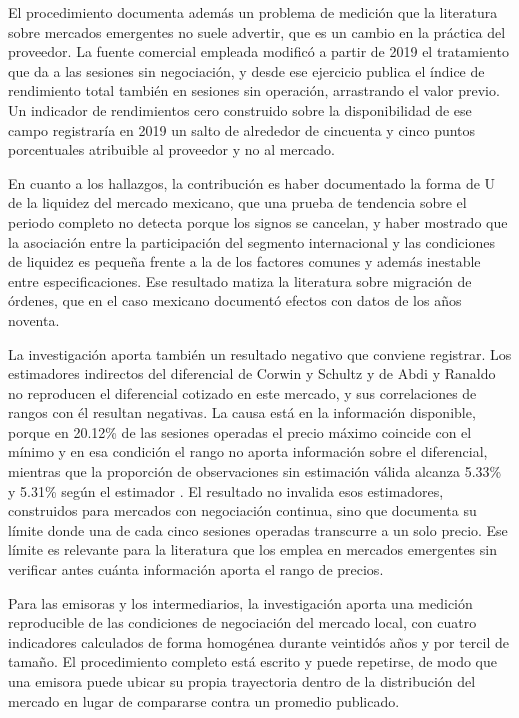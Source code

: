 El procedimiento documenta además un problema de medición que la literatura sobre mercados emergentes no suele advertir, que es un cambio en la práctica del proveedor. La fuente comercial empleada modificó a partir de 2019 el tratamiento que da a las sesiones sin negociación, y desde ese ejercicio publica el índice de rendimiento total también en sesiones sin operación, arrastrando el valor previo. Un indicador de rendimientos cero construido sobre la disponibilidad de ese campo registraría en 2019 un salto de alrededor de cincuenta y cinco puntos porcentuales atribuible al proveedor y no al mercado.

En cuanto a los hallazgos, la contribución es haber documentado la forma de U de la liquidez del mercado mexicano, que una prueba de tendencia sobre el periodo completo no detecta porque los signos se cancelan, y haber mostrado que la asociación entre la participación del segmento internacional y las condiciones de liquidez es pequeña frente a la de los factores comunes y además inestable entre especificaciones. Ese resultado matiza la literatura sobre migración de órdenes, que en el caso mexicano documentó efectos con datos de los años noventa.

La investigación aporta también un resultado negativo que conviene registrar. Los estimadores indirectos del diferencial de Corwin y Schultz y de Abdi y Ranaldo no reproducen el diferencial cotizado en este mercado, y sus correlaciones de rangos con él resultan negativas. La causa está en la información disponible, porque en 20.12\% de las sesiones operadas el precio máximo coincide con el mínimo y en esa condición el rango no aporta información sobre el diferencial, mientras que la proporción de observaciones sin estimación válida alcanza 5.33\% y 5.31\% según el estimador . El resultado no invalida esos estimadores, construidos para mercados con negociación continua, sino que documenta su límite donde una de cada cinco sesiones operadas transcurre a un solo precio. Ese límite es relevante para la literatura que los emplea en mercados emergentes sin verificar antes cuánta información aporta el rango de precios.


Para las emisoras y los intermediarios, la investigación aporta una medición reproducible de las condiciones de negociación del mercado local, con cuatro indicadores calculados de forma homogénea durante veintidós años y por tercil de tamaño. El procedimiento completo está escrito y puede repetirse, de modo que una emisora puede ubicar su propia trayectoria dentro de la distribución del mercado en lugar de compararse contra un promedio publicado.

